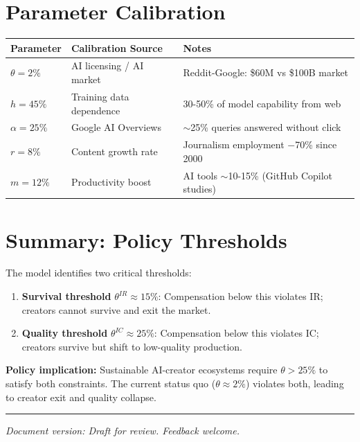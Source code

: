 \documentclass[11pt,a4paper]{article}
\begin{document}
\section{Parameter Calibration}

\begin{center}
\begin{tabular}{lll}
\toprule
Parameter & Calibration Source & Notes\\
\midrule
$\theta = 2\%$ & AI licensing / AI market & Reddit-Google: \$60M vs \$100B market\\
$h = 45\%$ & Training data dependence & 30-50\% of model capability from web\\
$\alpha = 25\%$ & Google AI Overviews & $\sim$25\% queries answered without click\\
$r = 8\%$ & Content growth rate & Journalism employment $-$70\% since 2000\\
$m = 12\%$ & Productivity boost & AI tools $\sim$10-15\% (GitHub Copilot studies)\\
\bottomrule
\end{tabular}
\end{center}

\section{Summary: Policy Thresholds}

The model identifies two critical thresholds:

\begin{enumerate}
\item \textbf{Survival threshold} $\theta^{IR} \approx 15\%$: Compensation below this violates IR; creators cannot survive and exit the market.

\item \textbf{Quality threshold} $\theta^{IC} \approx 25\%$: Compensation below this violates IC; creators survive but shift to low-quality production.
\end{enumerate}

\textbf{Policy implication:} Sustainable AI-creator ecosystems require $\theta > 25\%$ to satisfy both constraints. The current status quo ($\theta \approx 2\%$) violates both, leading to creator exit and quality collapse.

\vspace{1em}
\hrule
\vspace{0.5em}
\textit{Document version: Draft for review. Feedback welcome.}
\end{document}
